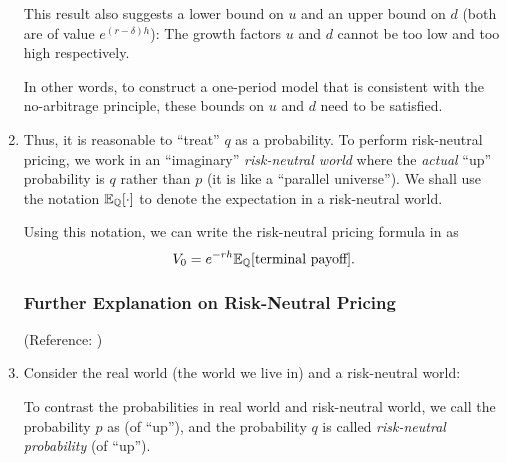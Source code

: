 \begin{enumerate}
\begin{note}
This result also suggests a lower bound on \(u\) and an upper bound on \(d\)
(both are of value \(e^{(r-\delta)h}\)): The growth factors \(u\) and \(d\)
cannot be too low and too high respectively.

In other words, to construct a one-period model that is consistent with the
no-arbitrage principle, these bounds on \(u\) and \(d\) need to be satisfied.
 \end{note}
\item \label{it:rn-pricing-fmla}
Thus, it is reasonable to ``treat'' \(q\) as a probability. To perform
risk-neutral pricing, we work in an ``imaginary'' \emph{risk-neutral world}
where the \emph{actual} ``up'' probability is \(q\) rather than \(p\) (it is
like a ``parallel universe''). We shall use the notation \(\mathbb{E}_{\mathbb{Q}}\qty[\cdot]\) to
denote the expectation in a risk-neutral world.

Using this notation, we can write the risk-neutral pricing formula in
 as
\[
V_0=e^{-rh}\mathbb{E}_{\mathbb{Q}}\qty[\text{terminal payoff}].
\]
\subsubsection*{Further Explanation on Risk-Neutral Pricing}
(Reference: \textcite[Section~4.1.2]{lo2018derivative})

\item Consider the real world (the world we live in) and a risk-neutral
world:

\begin{center}

\end{center}
\begin{note}
To contrast the probabilities in real world and risk-neutral world, we call the
probability \(p\) as  (of ``up''), and the probability
\(q\) is called \emph{risk-neutral probability} (of ``up'').
\end{note}


\end{enumerate}
